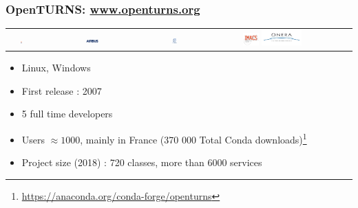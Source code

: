 \documentclass{beamer}
\begin{document}
\begin{frame}
\frametitle{OpenTURNS: \url{www.openturns.org}}

\begin{center}
   \begin{tabular}{ccccc}
   \includegraphics[width=0.07\textwidth]{figures/logoEDF_Anne.png}&
   \includegraphics[width=0.12\textwidth]{figures/LogoAirbus.png}&
   \includegraphics[width=0.12\textwidth]{figures/logo_phimeca.png}&
   \includegraphics[width=0.12\textwidth]{figures/logo_Imacs.png}
   \includegraphics[width=0.30\textwidth]{figures/logo_ONERA.jpg}&
   \end{tabular}
\end{center}

\vspace*{0.05cm}
\begin{itemize}
\item Linux, Windows
\item First release : 2007
\item 5 full time developers
\item Users $\approx 1000$, mainly in France
(370 000 Total Conda downloads)\footnote{\url{https://anaconda.org/conda-forge/openturns}}	
\item Project size (2018) : 720 classes, more than 6000 services
\end{itemize}

\end{frame}

\end{document}
